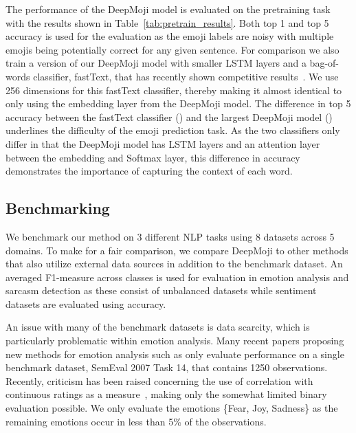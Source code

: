 \documentclass[11pt,a4paper]{article}
\newcommand{\ndsets}{8}
\newcommand{\ndomains}{5}
\begin{document}
The performance of the DeepMoji model is evaluated on the pretraining task with the results shown in Table~\ref{tab:pretrain_results}. Both top 1 and top 5 accuracy is used for the evaluation as the emoji labels are noisy with multiple emojis being potentially correct for any given sentence. For comparison we also train a version of our DeepMoji model with smaller LSTM layers and a bag-of-words classifier, fastText, that has recently shown competitive results~\cite{joulin2016bag}. We use 256 dimensions for this fastText classifier, thereby making it almost identical to only using the embedding layer from the DeepMoji model. The difference in top 5 accuracy between the fastText classifier () and the largest DeepMoji model () underlines the difficulty of the emoji prediction task. As the two classifiers only differ in that the DeepMoji model has LSTM layers and an attention layer between the embedding and Softmax layer, this difference in accuracy demonstrates the importance of capturing the context of each word. 

\subsection{Benchmarking}
\label{sub_sec:benchmarking}

We benchmark our method on 3 different NLP tasks using \ndsets{} datasets across \ndomains{} domains. To make for a fair comparison, we compare DeepMoji to other methods that also utilize external data sources in addition to the benchmark dataset. An averaged F1-measure across classes is used for evaluation in emotion analysis and sarcasm detection as these consist of unbalanced datasets while sentiment datasets are evaluated using accuracy.

An issue with many of the benchmark datasets is data scarcity, which is particularly problematic within emotion analysis. Many recent papers proposing new methods for emotion analysis such as \cite{staiano2014depechemood} only evaluate performance on a single benchmark dataset, SemEval 2007 Task 14, that contains 1250 observations. Recently, criticism has been raised concerning the use of correlation with continuous ratings as a measure~\cite{sven_emotions}, making only the somewhat limited binary evaluation possible. We only evaluate the emotions \{Fear, Joy, Sadness\} as the remaining emotions occur in less than 5\% of the observations.
\end{document}
